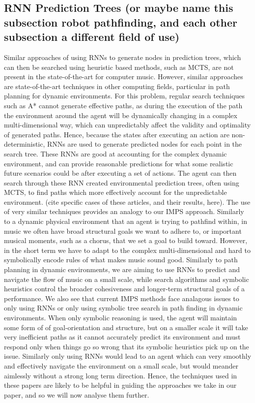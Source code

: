 \subsection{RNN Prediction Trees (or maybe name this subsection robot pathfinding, and each other subsection a different field of use)}
Similar approaches of using RNNs to generate nodes in prediction trees, which can then be searched using heuristic based methods, such as MCTS, are not present in the state-of-the-art for computer music. However, similar approaches are state-of-the-art techniques in other computing fields, particular in path planning for dynamic environments. For this problem, regular search techniques such as A* cannot generate effective paths, as during the execution of the path the environment around the agent will be dynamically changing in a complex multi-dimensional way, which can unpredictably affect the validity and optimality of generated paths. Hence, because the states after executing an action are non-deterministic, RNNs are used to generate predicted nodes for each point in the search tree. These RNNs are good at accounting for the complex dynamic environment, and can provide reasonable predictions for what some realistic future scenarios could be after executing a set of actions. The agent can then search through these RNN created environmental prediction trees, often using MCTS, to find paths which more effectively account for the unpredictable environment. (cite specific cases of these articles, and their results, here). The use of very similar techniques provides an analogy to our IMPS approach. Similarly to a dynamic physical environment that an agent is trying to pathfind within, in music we often have broad structural goals we want to adhere to, or important musical moments, such as a chorus, that we set a goal to build toward. However, in the short term we have to adapt to the complex multi-dimensional and hard to symbolically encode rules of what makes music sound good. Similarly to path planning in dynamic environments, we are aiming to use RNNs to predict and navigate the flow of music on a small scale, while search algorithms and symbolic heuristics control the broader cohesiveness and longer-term structural goals of a performance. We also see that current IMPS methods face analagous issues to only using RNNs or only using symbolic tree search in path finding in dynamic environments. When only symbolic reasoning is used, the agent will maintain some form of of goal-orientation and structure, but on a smaller scale it will take very inefficient paths as it cannot accurately predict its environment and must respond only when things go so wrong that its symbolic heuristics pick up on the issue. Similarly only using RNNs would lead to an agent which can very smoothly and effectively navigate the environment on a small scale, but would meander aimlessly without a strong long term direction. Hence, the techniques used in these papers are likely to be helpful in guiding the approaches we take in our paper, and so we will now analyse them further.

